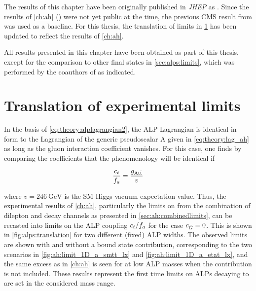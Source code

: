 The results of this chapter have been originally published in \textit{JHEP} as . Since the results of \cref{ch:ah} () were not yet public at the time, the previous CMS result from  was used as a baseline. For this thesis, the translation of limits in \cref{sec:alps:translation} has been updated to reflect the results of \cref{ch:ah}.

All results presented in this chapter have been obtained as part of this thesis, except for the comparison to other final states in \cref{sec:alps:limits}, which was performed by the coauthors of  as indicated.


\section{Translation of experimental limits}
\label{sec:alps:translation}

In the basis of \cref{eq:theory:alplagrangian2}, the ALP Lagrangian is identical in form to the Lagrangian of the generic pseudoscalar A given in \cref{eq:theory:lag_ah} as long as the gluon interaction coefficient \cG vanishes. For this case, one finds by comparing the coefficients that the phenomenology will be identical if

\begin{equation}
    \frac{c_t}{f_a} = \frac{g_{\mathrm{A t \bar{t}}}}{v}
\end{equation}

\noindent where $v=\SI{246}{\GeV}$ is the SM Higgs vacuum expectation value. Thus, the experimental results of \cref{ch:ah}, particularly the limits on \gAtt from the combination of dilepton and \ljets decay channels as presented in \cref{sec:ah:combinedlimits}, can be recasted into limits on the ALP coupling $c_t/f_a$ for the case $c_{\tilde{G}} = 0$. This is shown in \cref{fig:alps:translation} for two different (fixed) ALP widths.
The observed limits are shown with and without a \ttbar bound state contribution, corresponding to the two scenarios in \cref{fig:ah:limit_1D_a_smtt_lx} and \cref{fig:ah:limit_1D_a_etat_lx}, and the same excess as in \cref{ch:ah} is seen for at low ALP masses when the \etat contribution is not included. These results represent the first time limits on ALPs decaying to \ttbar are set in the considered mass range.


